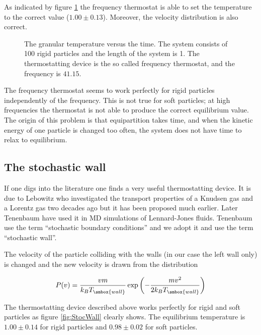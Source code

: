 As indicated by figure \ref{fig:Freq} the frequency thermostat is able
to set the temperature to the correct value ($1.00 \pm
0.13$). Moreover, the velocity distribution is also correct.

\begin{figure}
  \begin{center}
  \end{center}
  \caption[The frequency device]{The granular temperature versus the
    time. The system 
    consists of 100 rigid particles and the length of the system is
    1. The thermostatting device is the so called frequency
    thermostat, and the frequency is $41.15$.\label{fig:Freq}}  
\end{figure}

The frequency thermostat seems to work perfectly for rigid particles
independently of the frequency. This is not true for soft particles; at
high frequencies the thermostat is not able to produce the correct
equilibrium value. The origin of this problem is that equipartition
takes time, and when the kinetic energy of one particle is changed too
often, the system does not have time to relax to equilibrium.

\subsection{The stochastic wall}
\label{sect:StocWall}
If one digs into the literature one finds a very useful thermostatting
device. It is due to Lebowitz \etal \cite{Lebowitz57,Lebowitz78} who
investigated the transport properties of a Knudsen gas and a Lorentz
gas two decades ago but it has been proposed much earlier. Later
Tenenbaum \etal \cite{Tenenbaum82a,Tenenbaum83a} have used it
in MD simulations of Lennard-Jones fluids. Tenenbaum \etal use the
term ``stochastic boundary conditions'' and we adopt it and use
the term ``stochastic wall''.

The velocity of the particle colliding with the walls (in our case the
left wall only) is changed and the new velocity is drawn from the
distribution

\begin{equation}
\label{eq:StocWall}
  P(v) = \frac{vm}{k_B T_{\smbox{wall}}}
     \exp\left({-\frac{mv^2}{2k_B T_{\smbox{wall}}}}\right)
\end{equation}

The thermostatting device described above works perfectly for rigid
and soft particles as figure \ref{fig:StocWall} clearly shows. The
equilibrium temperature is $1.00 \pm 0.14$ for rigid particles and
$0.98 \pm 0.02$ for soft particles.

